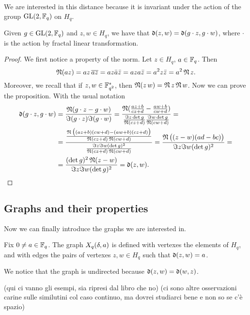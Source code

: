 We are interested in this distance because it is invariant under the action of the group $\operatorname{GL}(2,{\mathbb F}_q)$ on $H_q$.
\begin{prop}
Given $g \in \operatorname{GL}(2,{\mathbb F}_q)$ and $z,w \in H_q$, we have that $\operatorname{\mathfrak{d}} (z,w)=\operatorname{\mathfrak{d}}(g \cdot z,g\cdot w)$,
where $\cdot$ is the action by fractal linear transformation.
\begin{proof}
We first notice a property of the norm. Let $z\in H_q$, $a\in {\mathbb F}_q$. Then
\begin{equation}\label{norm_prop}
\operatorname{\mathfrak{N}} (az) = az \, \overline{az} = az\bar{a}\bar{z}=aza\bar{z}=a^2 z \bar{z}=a^2 \operatorname{\mathfrak{N}} z.
\end{equation}
Moreover, we recall that if $z,w \in {\mathbb F}_{q^2}^{*}$, then $\operatorname{\mathfrak{N}} (z\,w)= \operatorname{\mathfrak{N}} z \operatorname{\mathfrak{N}} w$.
Now we can prove the proposition. With the usual notation
	\begin{align*}
	\operatorname{\mathfrak{d}} (g\cdot z,g\cdot w)&=\frac{\operatorname{\mathfrak{N}} (g\cdot z-g\cdot w)}{\Im (g\cdot z) \Im (g\cdot w)}
							  =\frac{\operatorname{\mathfrak{N}}(\frac{az+b}{cz+d} -
							   \frac{aw+b}{cw+d})}{\frac{\Im z \det g}{\operatorname{\mathfrak{N}} (cz+d)}\frac{\Im w \det g}{\operatorname{\mathfrak{N}} (cw+d)}}=\\
							  &=\frac{\frac{\operatorname{\mathfrak{N}}\big((az+b)(cw+d)-(aw+b)(cz+d)\big)}{\operatorname{\mathfrak{N}}(cz+d)\operatorname{\mathfrak{N}} (cw+d)}}
							  {\frac{\Im z \Im w (\det g)^2}{\operatorname{\mathfrak{N}} (cz+d)\operatorname{\mathfrak{N}} (cw+d)}}
							  =\frac{\operatorname{\mathfrak{N}} \big((z-w)(ad-bc)\big)}{\Im z \Im w (\det g)^2}=\\
							  &=\frac{(\det g)^2 \operatorname{\mathfrak{N}} (z-w)}{\Im z \Im w (\det g)^2}=\operatorname{\mathfrak{d}} (z,w).
	\end{align*}
\end{proof}
\end{prop}

\subsection{Graphs and their properties}
Now we can finally introduce the graphs we are interested in.
\begin{defn}
 Fix $0\neq a\in {\mathbb F}_q$. The graph $X_q (\delta ,a)$ is defined with vertexes the elements of $H_q$,
 and with edges the pairs of vertexes $z,w\in H_q$ such that $\operatorname{\mathfrak{d}} (z,w) = a$.
\end{defn}
\begin{rem}
We notice that the graph is undirected because $\operatorname{\mathfrak{d}} (z,w) = \operatorname{\mathfrak{d}} (w,z)$.
\end{rem}
(qui ci vanno gli esempi, sia ripresi dal libro che no)
(ci sono altre osservazioni carine sulle similutini col caso continuo, ma dovrei studiarci bene e non so se c'è spazio)

